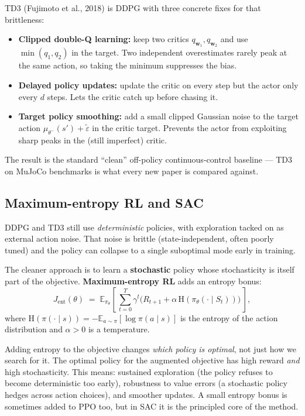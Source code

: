 \documentclass[11pt, oneside]{book}
\newcommand{\E}{\mathbb{E}}              %
\newcommand{\Ent}{\mathrm{H}}            %
\begin{document}
TD3 (Fujimoto et al., 2018) is DDPG with three concrete fixes for that brittleness:
\begin{itemize}
  \item \textbf{Clipped double-Q learning:} keep two critics $q_{\mathbf{w}_1}, q_{\mathbf{w}_2}$
    and use $\min(q_1, q_2)$ in the target.
    Two independent overestimates rarely peak at the same action, so taking the minimum
    suppresses the bias.
  \item \textbf{Delayed policy updates:} update the critic on every step but the actor
    only every $d$ steps. Lets the critic catch up before chasing it.
  \item \textbf{Target policy smoothing:} add a small clipped Gaussian noise to the
    target action $\mu_{\theta^-}(s') + \tilde\varepsilon$ in the critic target. Prevents
    the actor from exploiting sharp peaks in the (still imperfect) critic.
\end{itemize}
The result is the standard ``clean'' off-policy continuous-control baseline --- TD3
on MuJoCo benchmarks is what every new paper is compared against.

\subsection{Maximum-entropy RL and SAC}

DDPG and TD3 still use \emph{deterministic} policies, with exploration tacked on as
external action noise. That noise is brittle (state-independent, often poorly tuned)
and the policy can collapse to a single suboptimal mode early in training.

The cleaner approach is to learn a \textbf{stochastic} policy whose stochasticity is
itself part of the objective. \textbf{Maximum-entropy RL} adds an entropy bonus:
\[
  J_{\text{ent}}(\theta)
  \;=\; \E_{\pi_\theta}\!\left[\, \sum_{t=0}^{T} \gamma^t \bigl( R_{t+1} + \alpha\, \Ent(\pi_\theta(\cdot \mid S_t)) \bigr)\, \right],
\]
where $\Ent(\pi(\cdot \mid s)) = -\E_{a \sim \pi}[\log \pi(a \mid s)]$ is the entropy of
the action distribution and $\alpha > 0$ is a temperature.

\begin{intbox}[title={Why entropy as objective, not regularizer?}]
Adding entropy to the objective changes \emph{which policy is optimal}, not just how we
search for it.
The optimal policy for the augmented objective has high reward \emph{and} high
stochasticity.
This means: sustained exploration (the policy refuses to become deterministic too
early), robustness to value errors (a stochastic policy hedges across action choices),
and smoother updates.
A small entropy bonus is sometimes added to PPO too, but in SAC it is the principled
core of the method.
\end{intbox}
\end{document}
